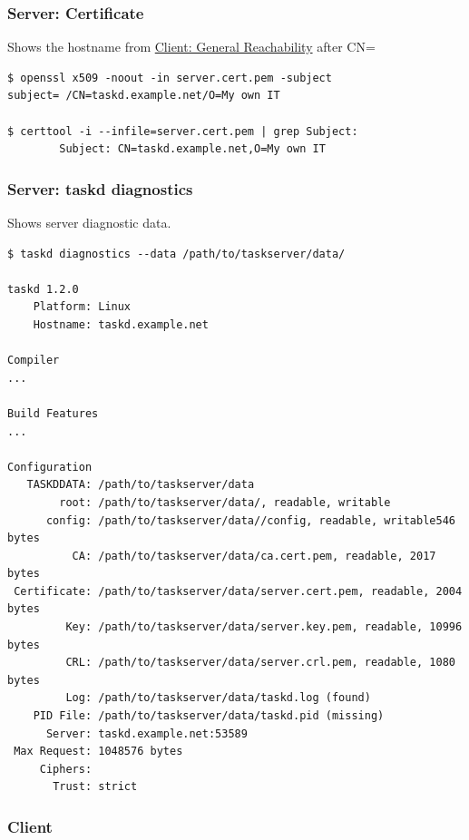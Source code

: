 \documentclass[t,handout]{beamer}
\begin{document}
\begin{frame}[fragile]\frametitle{Server: Certificate}\label{S3}
    \vfill
    Shows the hostname from \hyperlink{C1}{Client: General Reachability} after CN=
    \begin{lstlisting}
$ openssl x509 -noout -in server.cert.pem -subject
subject= /CN=taskd.example.net/O=My own IT

$ certtool -i --infile=server.cert.pem | grep Subject:
        Subject: CN=taskd.example.net,O=My own IT\end{lstlisting}

    \vfill
\end{frame}

\begin{frame}[fragile]\frametitle{Server: taskd diagnostics}\label{S4}
    \vfill
    Shows server diagnostic data.
    \begin{lstlisting}
$ taskd diagnostics --data /path/to/taskserver/data/

taskd 1.2.0
    Platform: Linux
    Hostname: taskd.example.net

Compiler
...

Build Features
...

Configuration
   TASKDDATA: /path/to/taskserver/data
        root: /path/to/taskserver/data/, readable, writable
      config: /path/to/taskserver/data//config, readable, writable546 bytes
          CA: /path/to/taskserver/data/ca.cert.pem, readable, 2017 bytes
 Certificate: /path/to/taskserver/data/server.cert.pem, readable, 2004 bytes
         Key: /path/to/taskserver/data/server.key.pem, readable, 10996 bytes
         CRL: /path/to/taskserver/data/server.crl.pem, readable, 1080 bytes
         Log: /path/to/taskserver/data/taskd.log (found)
    PID File: /path/to/taskserver/data/taskd.pid (missing)
      Server: taskd.example.net:53589
 Max Request: 1048576 bytes
     Ciphers:
       Trust: strict\end{lstlisting}

    \vfill
\end{frame}

\subsubsection{Client}
\end{document}
